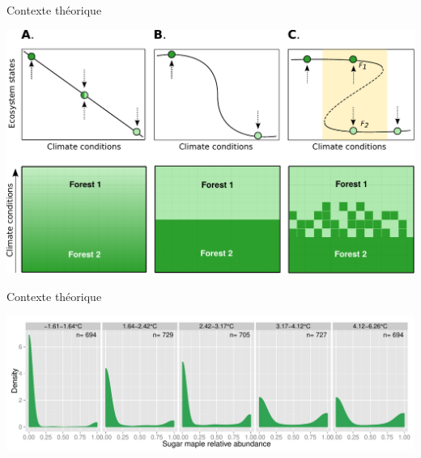 \documentclass{eecslides}
\begin{document}

	\begin{frame}{Contexte théorique}
		\begin{center}
		\includegraphics[height=0.6\textheight]{states}\\
		\end{center}
	\end{frame}


	\begin{frame}{Contexte théorique}
		\begin{center}
		\includegraphics[height=0.4\textheight]{ass_ers}\\
		\end{center}
	\end{frame}
\end{document}
